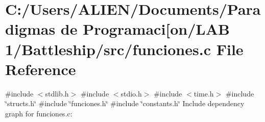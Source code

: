 \section{C\+:/\+Users/\+A\+L\+I\+E\+N/\+Documents/\+Paradigmas de Programaci[on/\+L\+AB 1/\+Battleship/src/funciones.c File Reference}
\label{funciones_8c}\index{C\+:/\+Users/\+A\+L\+I\+E\+N/\+Documents/\+Paradigmas de Programaci[on/\+L\+A\+B 1/\+Battleship/src/funciones.\+c@{C\+:/\+Users/\+A\+L\+I\+E\+N/\+Documents/\+Paradigmas de Programaci[on/\+L\+A\+B 1/\+Battleship/src/funciones.\+c}}
{\ttfamily \#include $<$stdlib.\+h$>$}\newline
{\ttfamily \#include $<$stdio.\+h$>$}\newline
{\ttfamily \#include $<$time.\+h$>$}\newline
{\ttfamily \#include \char`\"{}structs.\+h\char`\"{}}\newline
{\ttfamily \#include \char`\"{}funciones.\+h\char`\"{}}\newline
{\ttfamily \#include \char`\"{}constants.\+h\char`\"{}}\newline
Include dependency graph for funciones.\+c\+:
